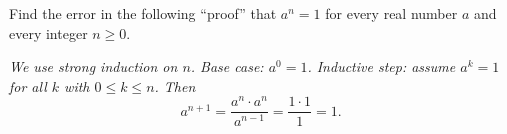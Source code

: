 Find the error in the following ``proof'' that $a^n=1$ for every real number $a$ and every integer $n\ge0$.

\emph{We use strong induction on $n$. Base case: $a^0=1$. Inductive step: assume $a^k=1$ for all $k$ with $0\le k\le n$. Then}
\[a^{n+1}=\dfrac{a^n\cdot a^n}{a^{n-1}}=\dfrac{1\cdot1}{1}=1.\]
